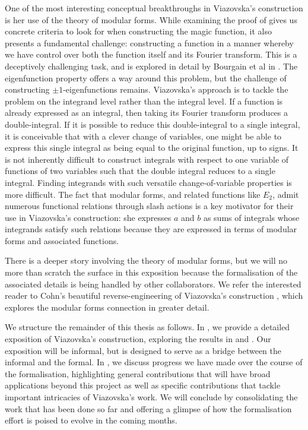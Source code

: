 One of the most interesting conceptual breakthroughs in Viazovska's construction is her use of the theory of modular forms. While examining the proof of  gives us concrete criteria to look for when constructing the magic function, it also presents a fundamental challenge: constructing a function in a manner whereby we have control over both the function itself and its Fourier transform. This is a deceptively challenging task, and is explored in detail by Bourgain et al in \cite{UncertaintyPrincipleFR}. The eigenfunction property offers a way around this problem, but the challenge of constructing $\pm 1$-eigenfunctions remains. Viazovska's approach is to tackle the problem on the integrand level rather than the integral level. If a function is already expressed as an integral, then taking its Fourier transform produces a double-integral. If it is possible to reduce this double-integral to a single integral, it is conceivable that with a clever change of variables, one might be able to express this single integral as being equal to the original function, up to signs. It is not inherently difficult to construct integrals with respect to one variable of functions of two variables such that the double integral reduces to a single integral. Finding integrands with such versatile change-of-variable properties is more difficult. The fact that modular forms, and related functions like $E_2$, admit numerous functional relations through slash actions is a key motivator for their use in Viazovska's construction: she expresses $a$ and $b$ as sums of integrals whose integrands satisfy such relations because they are expressed in terms of modular forms and associated functions.

There is a deeper story involving the theory of modular forms, but we will no more than scratch the surface in this exposition because the formalisation of the associated details is being handled by other collaborators. We refer the interested reader to Cohn's beautiful reverse-engineering of Viazovska's construction \cite{CohnOnViazovskaICM}, which explores the modular forms connection in greater detail.

We structure the remainder of this thesis as follows. In , we provide a detailed exposition of Viazovska's construction, exploring the results in \cite[\S 4]{Viazovska8} and \cite[\S 7, which was written by Viazovska herself]{blueprint}. Our exposition will be informal, but is designed to serve as a bridge between the informal and the formal. In , we discuss progress we have made over the course of the formalisation, highlighting general contributions that will have broad applications beyond this project as well as specific contributions that tackle important intricacies of Viazovska's work. We will conclude by consolidating the work that has been done so far and offering a glimpse of how the formalisation effort is poised to evolve in the coming months.